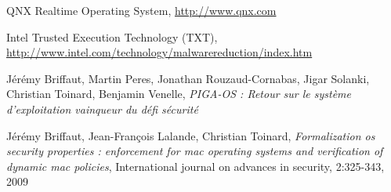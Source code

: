 \documentclass[pdftex,a4paper,titlepage,11pt]{article}
\begin{document}
\begin{thebibliography}{40}
 QNX Realtime Operating System, \url{http://www.qnx.com}

 Intel Trusted Execution Technology (TXT), \url{http://www.intel.com/technology/malwarereduction/index.htm}

 Jérémy Briffaut, Martin Peres, Jonathan Rouzaud-Cornabas, Jigar Solanki, Christian Toinard, Benjamin Venelle, \textit{PIGA-OS : Retour sur le système d'exploitation vainqueur du défi sécurité}

 Jérémy Briffaut, Jean-François Lalande, Christian Toinard, \textit{Formalization os security properties : enforcement for mac operating systems and verification of dynamic mac policies}, International journal on advances in security, 2:325-343, 2009

\end{thebibliography}

\end{document}
